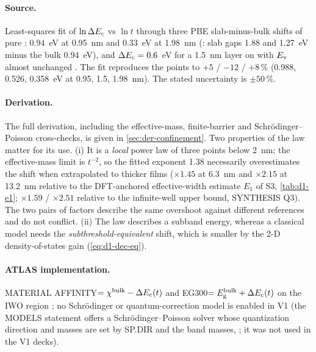 \paragraph{Source.}
Least-squares fit of $\ln\Delta E_{\mathrm{c}}$ vs $\ln t$ through three PBE slab-minus-bulk shifts of pure \InO{}:
$0.94$~eV at 0.95~nm and $0.33$~eV at 1.98~nm (\citealp[p.~21542]{Lin2022}: slab gaps 1.88 and 1.27~eV
minus the bulk 0.94~eV), and $\Delta E_{\mathrm{c}} = 0.6$~eV for a 1.5~nm \InO{} layer on \AlO{} with $E_{\mathrm{v}}$ almost unchanged
\citep[p.~504]{Si2021}. The fit reproduces the points to $+5$ / $-12$ / $+8$\,\% (0.988, 0.526, 0.358~eV at
0.95, 1.5, 1.98~nm). The stated uncertainty is $\pm50$\,\%.

\paragraph{Derivation.} The full derivation, including the effective-mass, finite-barrier and
Schr\"odinger--Poisson cross-checks, is given in \cref{sec:der-confinement}. Two properties of the law matter
for its use. (i) It is a \emph{local} power law of three points below 2~nm; the effective-mass limit is
$t^{-2}$, so the fitted exponent 1.38 necessarily overestimates the shift when extrapolated to thicker films
($\times1.45$ at 6.3~nm and $\times2.15$ at 13.2~nm relative to the DFT-anchored effective-width estimate $E_1$ of S3,
\cref{tab:d1-e1}; $\times1.59$ / $\times2.51$ relative to the infinite-well upper bound, SYNTHESIS Q3). The two pairs
of factors describe the same overshoot against different references and do not conflict.
(ii) The law describes a subband energy, whereas a classical model needs the \emph{subthreshold-equivalent}
shift, which is smaller by the 2-D density-of-states gain (\cref{eq:d1-dec-eq}).

\paragraph{ATLAS implementation.}
MATERIAL AFFINITY$=\chi^{\mathrm{bulk}}-\Delta E_{\mathrm{c}}(t)$ and EG300$=E_{\mathrm{g}}^{\mathrm{bulk}}+\Delta E_{\mathrm{c}}(t)$ on the IWO region
\citep[pp.~1337--1338]{AtlasManual}; no Schr\"odinger or quantum-correction model is enabled in V1 (the MODELS
statement offers a Schr\"odinger--Poisson solver whose quantization direction and masses are set by SP.DIR
and the band masses, \citealp[p.~1469]{AtlasManual}; it was not used in the V1 decks).

